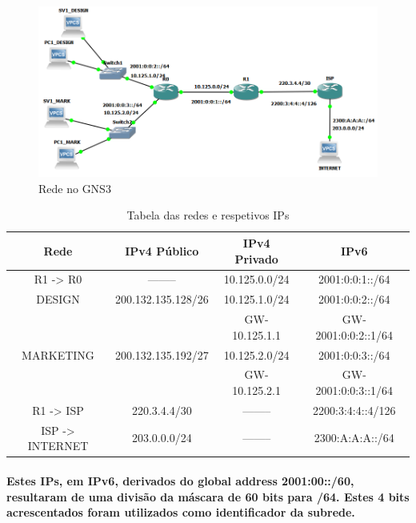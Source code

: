 \documentclass{report}
\begin{document}
\begin{figure}
    \centering
    \includegraphics[scale=0.6]{network.png}
    \caption{Rede no GNS3}
\end{figure}
\begin{center}
    
\begin{table}
\begin{tabular}{|c|c|c|c|}
    \hline
    Rede & IPv4 Público & IPv4 Privado & IPv6 \\
    \hline
    R1 -> R0 & -------- & 10.125.0.0/24 & 2001:0:0:1::/64 \\
    \hline
    DESIGN & 200.132.135.128/26 & 10.125.1.0/24 & 2001:0:0:2::/64 \\
    & & GW- 10.125.1.1 & GW- 2001:0:0:2::1/64\\
    \hline
    MARKETING & 200.132.135.192/27 & 10.125.2.0/24 & 2001:0:0:3::/64 \\
    & & GW- 10.125.2.1 & GW- 2001:0:0:3::1/64 \\
    \hline
    R1 -> ISP & 220.3.4.4/30 & -------- & 2200:3:4:4::4/126\\
    \hline
    ISP -> INTERNET & 203.0.0.0/24 & -------- & 2300:A:A:A::/64\\
    \hline
    
\end{tabular}
\caption{Tabela das redes e respetivos IPs}
\end{table}
\end{center}

\paragraph{Estes IPs, em IPv6, derivados do global address 2001:00::/60, resultaram de uma divisão da máscara de 60 bits para /64. Estes 4 bits acrescentados foram utilizados como identificador da subrede.}
\end{document}
